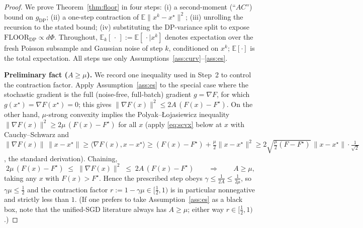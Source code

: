 \begin{proof}
We prove Theorem~\ref{thm:floor} in four steps: (i) a second-moment (``$AC$'') bound on $g_{\mathrm{DP}}$; (ii) a one-step contraction of $\mathbb E\|x^k-x^\star\|^2$; (iii) unrolling the recursion to the stated bound; (iv) substituting the DP-variance split to expose $\mathrm{FLOOR}_{\mathrm{DP}}\propto d\Phi$. Throughout, $\mathbb E_k[\,\cdot\,]:=\mathbb E[\,\cdot\mid x^k]$ denotes expectation over the fresh Poisson subsample and Gaussian noise of step $k$, conditioned on $x^k$; $\mathbb E[\cdot]$ is the total expectation. All steps use only Assumptions~\ref{ass:curv}--\ref{ass:es}.

\medskip
\noindent\textbf{Preliminary fact ($A\ge\mu$).}
We record one inequality used in Step~2 to control the contraction factor. Apply Assumption~\ref{ass:es} to the special case where the stochastic gradient is the full (noise-free, full-batch) gradient $g=\nabla F$, for which $g(x^\star)=\nabla F(x^\star)=0$; this gives $\|\nabla F(x)\|^2\le 2A\,(F(x)-F^\star)$. On the other hand, $\mu$-strong convexity implies the Polyak--\L ojasiewicz inequality $\|\nabla F(x)\|^2\ge 2\mu\,(F(x)-F^\star)$ for all $x$ (apply \eqref{eq:scvx} below at $x$ with Cauchy--Schwarz and $\|\nabla F(x)\|\,\|x-x^\star\|\ge\langle\nabla F(x),x-x^\star\rangle\ge (F(x)-F^\star)+\tfrac\mu2\|x-x^\star\|^2\ge 2\sqrt{\tfrac\mu2(F-F^\star)}\,\|x-x^\star\|\cdot\tfrac1{\sqrt2}$, the standard derivation). Chaining,
\[
2\mu\,(F(x)-F^\star)\;\le\;\|\nabla F(x)\|^2\;\le\;2A\,(F(x)-F^\star)
\qquad\Longrightarrow\qquad A\ge\mu,
\]
taking any $x$ with $F(x)>F^\star$. Hence the prescribed step obeys $\gamma\le\tfrac1{2A}\le\tfrac1{2\mu}$, so $\gamma\mu\le\tfrac12$ and the contraction factor $r:=1-\gamma\mu\in[\tfrac12,1)$ is in particular nonnegative and strictly less than $1$. (If one prefers to take Assumption~\ref{ass:es} as a black box, note that the unified-SGD literature always has $A\ge\mu$; either way $r\in[\tfrac12,1)$.)


\end{proof}
